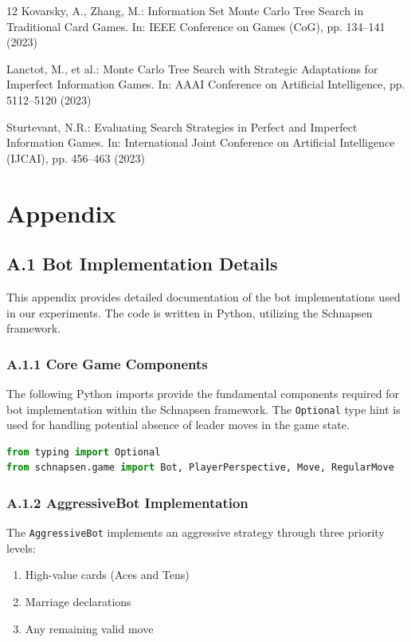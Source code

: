 \documentclass[runningheads]{llncs}
\begin{document}
\begin{thebibliography}{12}
Kovarsky, A., Zhang, M.: Information Set Monte Carlo Tree Search in Traditional Card Games. In: IEEE Conference on Games (CoG), pp. 134--141 (2023)

Lanctot, M., et al.: Monte Carlo Tree Search with Strategic Adaptations for Imperfect Information Games. In: AAAI Conference on Artificial Intelligence, pp. 5112--5120 (2023)

Sturtevant, N.R.: Evaluating Search Strategies in Perfect and Imperfect Information Games. In: International Joint Conference on Artificial Intelligence (IJCAI), pp. 456--463 (2023)
\end{thebibliography}

\appendix

\section{Appendix}

\subsection{A.1 Bot Implementation Details}

This appendix provides detailed documentation of the bot implementations used in our experiments. The code is written in Python, utilizing the Schnapsen framework.

\subsubsection{A.1.1 Core Game Components}
The following Python imports provide the fundamental components required for bot implementation within the Schnapsen framework. The \texttt{Optional} type hint is used for handling potential absence of leader moves in the game state.

\begin{lstlisting}[language=Python, caption={Core imports for bot implementation}]
from typing import Optional
from schnapsen.game import Bot, PlayerPerspective, Move, RegularMove
\end{lstlisting}

\subsubsection{A.1.2 AggressiveBot Implementation}
The \texttt{AggressiveBot} implements an aggressive strategy through three priority levels:
\begin{enumerate}
    \item High-value cards (Aces and Tens)
    \item Marriage declarations
    \item Any remaining valid move
\end{enumerate}
\end{document}
